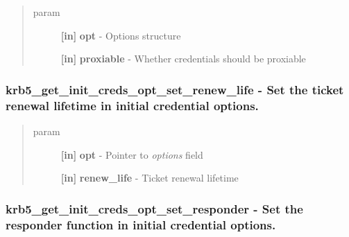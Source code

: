 \documentclass[letterpaper,10pt,english]{sphinxmanual}
\begin{document}
\begin{quote}\begin{description}
\item[{param}] \leavevmode
\textbf{{[}in{]}} \textbf{opt} - Options structure

\textbf{{[}in{]}} \textbf{proxiable} - Whether credentials should be proxiable

\end{description}\end{quote}


\subsubsection{krb5\_get\_init\_creds\_opt\_set\_renew\_life -  Set the ticket renewal lifetime in initial credential options.}
\label{appdev/refs/api/krb5_get_init_creds_opt_set_renew_life::doc}\label{appdev/refs/api/krb5_get_init_creds_opt_set_renew_life:krb5-get-init-creds-opt-set-renew-life-set-the-ticket-renewal-lifetime-in-initial-credential-options}

\begin{fulllineitems}
\label{appdev/refs/api/krb5_get_init_creds_opt_set_renew_life:krb5_get_init_creds_opt_set_renew_life}
\end{fulllineitems}

\begin{quote}\begin{description}
\item[{param}] \leavevmode
\textbf{{[}in{]}} \textbf{opt} - Pointer to \emph{options} field

\textbf{{[}in{]}} \textbf{renew\_life} - Ticket renewal lifetime

\end{description}\end{quote}


\subsubsection{krb5\_get\_init\_creds\_opt\_set\_responder -  Set the responder function in initial credential options.}
\label{appdev/refs/api/krb5_get_init_creds_opt_set_responder:krb5-get-init-creds-opt-set-responder-set-the-responder-function-in-initial-credential-options}\label{appdev/refs/api/krb5_get_init_creds_opt_set_responder::doc}
\end{document}
